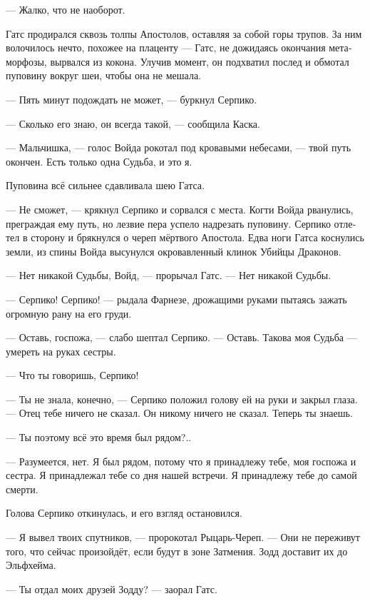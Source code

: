 \documentclass[a4paper,12pt,fleqn]{book}\usepackage{polyglossia}\setdefaultlanguage[babelshorthands=true]{russian}\setotherlanguage{english}\defaultfontfeatures{Ligatures=TeX,Mapping=tex-text}\usepackage{xcolor}\newcommand{\ml}[3]{#2}
\newcommand{\textspace}{\vspace{1em}{\centering\Large\bfseries<...>\par}\vspace{1em}}
\begin{document}
--- Жалко, что не наоборот.

\textspace

Гатс продирался сквозь толпы Апостолов, оставляя за собой горы трупов.
За ним волочилось нечто, похожее на плаценту --- Гатс, не дожидаясь окончания метаморфозы, вырвался из кокона.
Улучив момент, он подхватил послед и обмотал пуповину вокруг шеи, чтобы она не мешала.

--- Пять минут подождать не может, --- буркнул Серпико.

--- Сколько его знаю, он всегда такой, --- сообщила Каска. 

\textspace

--- Мальчишка, --- голос Войда рокотал под кровавыми небесами, --- твой путь окончен.
Есть только одна Судьба, и это я.

Пуповина всё сильнее сдавливала шею Гатса.

--- Не сможет, --- крякнул Серпико и сорвался с места.
Когти Войда рванулись, преграждая ему путь, но лезвие пера успело надрезать пуповину.
Серпико отлетел в сторону и брякнулся о череп мёртвого Апостола.
Едва ноги Гатса коснулись земли, из спины Войда высунулся окровавленный клинок Убийцы Драконов.

--- Нет никакой Судьбы, Войд, --- прорычал Гатс.
--- Нет никакой Судьбы.

--- Серпико!
Серпико! --- рыдала Фарнезе, дрожащими руками пытаясь зажать огромную рану на его груди.

--- Оставь, госпожа, --- слабо шептал Серпико.
--- Оставь.
Такова моя Судьба --- умереть на руках сестры.

--- Что ты говоришь, Серпико!

--- Ты не знала, конечно, --- Серпико положил голову ей на руки и закрыл глаза.
--- Отец тебе ничего не сказал.
Он никому ничего не сказал.
Теперь ты знаешь.

--- Ты поэтому всё это время был рядом?..

--- Разумеется, нет.
Я был рядом, потому что я принадлежу тебе, моя госпожа и сестра.
Я принадлежал тебе со дня нашей встречи.
Я принадлежу тебе до самой смерти.

Голова Серпико откинулась, и его взгляд остановился.

\textspace

--- Я вывел твоих спутников, --- пророкотал Рыцарь-Череп.
--- Они не переживут того, что сейчас произойдёт, если будут в зоне Затмения.
Зодд доставит их до Эльфхейма.

--- Ты отдал моих друзей Зодду? --- заорал Гатс.
\end{document}
